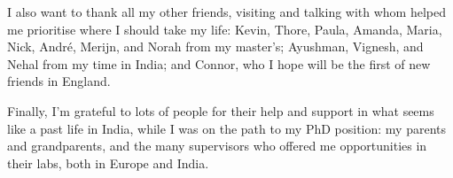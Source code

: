 I also want to thank all my other friends, visiting and talking with whom helped me prioritise where I should take my life: Kevin, Thore, Paula, Amanda, Maria, Nick, Andr{\'e}, Merijn, and Norah from my master's; Ayushman, Vignesh, and Nehal from my time in India; and Connor, who I hope will be the first of new friends in England.

Finally, I'm grateful to lots of people for their help and support in what seems like a past life in India, while I was on the path to my PhD position: my parents and grandparents, and the many supervisors who offered me opportunities in their labs, both in Europe and India.

{ \begin{center}  \end{center} }

\endgroup

